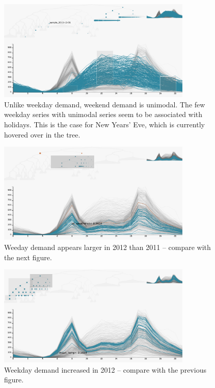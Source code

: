 \documentclass[12pt]{article}
\begin{document}
\begin{figure}

{\centering \includegraphics[width=350px]{figure/weekend} 

}

\caption{Unlike weekday demand, weekend demand is unimodal. The few weekday series with unimodal series seem to be associated with holidays. This is the case for New Years' Eve, which is currently hovered over in the tree.}\label{fig:weekend}
\end{figure}

\begin{figure}

{\centering \includegraphics[width=350px]{figure/weekday_2011} 

}

\caption{Weeday demand appears larger in 2012 than 2011 -- compare with the next figure.}\label{fig:weekday2011}
\end{figure}

\begin{figure}

{\centering \includegraphics[width=350px]{figure/weekday_2012} 

}

\caption{Weekday demand increased in 2012 -- compare with the previous figure.}\label{fig:weekday2012}
\end{figure}
\end{document}
